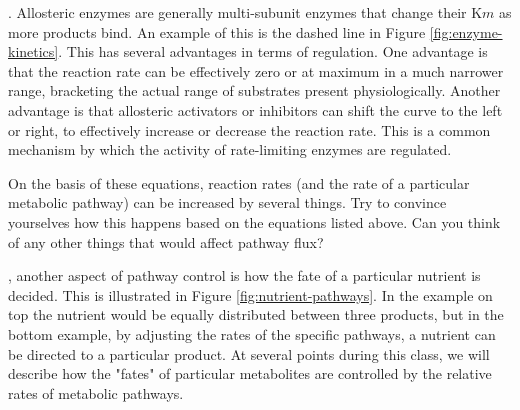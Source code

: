 \documentclass{tufte-handout}
\begin{document}
.  Allosteric enzymes are generally multi-subunit enzymes that change their K${m}$ as more products bind.  An example of this is the dashed line in Figure \ref{fig:enzyme-kinetics}.  This has several advantages in terms of regulation.  One advantage is that the reaction rate can be effectively zero or at maximum in a much narrower range, bracketing the actual range of substrates present physiologically.  Another advantage is that allosteric activators or inhibitors can shift the curve to the left or right, to effectively increase or decrease the reaction rate.  This is a common mechanism by which the activity of rate-limiting enzymes are regulated.

On the basis of these equations, reaction rates (and the rate of a particular metabolic pathway) can be increased by several things.  Try to convince yourselves how this happens based on the equations listed above. Can you think of any other things that would affect pathway flux? 

, another aspect of pathway control is how the fate of a particular nutrient is decided.  This is illustrated in Figure \ref{fig:nutrient-pathways}.  In the example on top the nutrient would be equally distributed between three products, but in the bottom example, by adjusting the rates of the specific pathways, a nutrient can be directed to a particular product.  At several points during this class, we will describe how the "fates" of particular metabolites are controlled by the relative rates of metabolic pathways.
\end{document}
